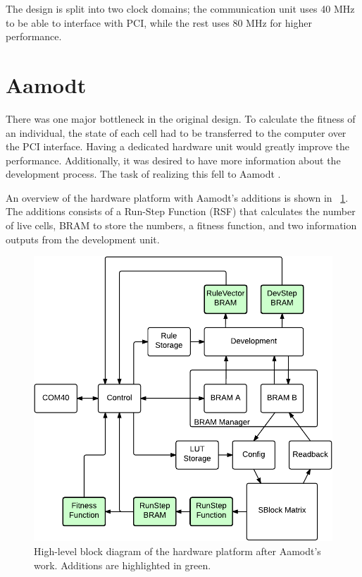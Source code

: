 The design is split into two clock domains; the communication unit uses 40 MHz to be able to interface with PCI, while the rest uses 80 MHz for higher performance.


\section{Aamodt}

There was one major bottleneck in the original design.
To calculate the fitness of an individual, the state of each cell had to be transferred to the computer over the PCI interface.
Having a dedicated hardware unit would greatly improve the performance.
Additionally, it was desired to have more information about the development process.
The task of realizing this fell to Aamodt \cite{aamodt2005sblock}.

An overview of the hardware platform with Aamodt's additions is shown in \figurename~\ref{fig:overview-aamodt}.
The additions consists of a Run-Step Function (RSF) that calculates the number of live cells, BRAM to store the numbers, a fitness function, and two information outputs from the development unit.

\begin{figure}[!ht]
    \centering
    \includegraphics[width=42\block]{figures/overview-aamodt}
    \caption[Aamodt's hardware design]{
        High-level block diagram of the hardware platform after Aamodt's work.
        Additions are highlighted in green.
    }
    \label{fig:overview-aamodt}
\end{figure}

